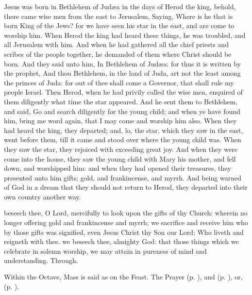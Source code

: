  Jesus was born in Bethlehem of Jud{\ae}a in the days of Herod the king, behold, there came wise men from the east to Jerusalem, Saying, Where is he that is born King of the Jews? for we have seen his star in the east, and are come to worship him. When Herod the king had heard these things, he was troubled, and all Jerusalem with him. And when he had gathered all the chief priests and scribes of the people together, he demanded of them where Christ should be born. And they said unto him, In Bethlehem of Jud{\ae}a: for thus it is written by the prophet, And thou Bethlehem, in the land of Juda, art not the least among the princes of Juda: for out of thee shall come a Governor, that shall rule my people Israel. Then Herod, when he had privily called the wise men, enquired of them diligently what time the star appeared. And he sent them to Bethlehem, and said, Go and search diligently for the young child; and when ye have found him, bring me word again, that I may come and worship him also. When they had heard the king, they departed; and, lo, the star, which they saw in the east, went before them, till it came and stood over where the young child was. When they saw the star, they rejoiced with exceeding great joy. And when they were come into the house, they saw the young child with Mary his mother,  and fell down, and worshipped him: and when they had opened their treasures, they presented unto him gifts; gold, and frankincense, and myrrh. And being warned of God in a dream that they should not return to Herod, they departed into their own country another way.

\secret\label{EpiphanyMassSecret}
 beseech thee, O Lord, mercifully to look upon the gifts of thy Church: wherein no longer offering gold and frankincense and myrrh; we sacrifice and receive him who by those gifts was signified, even Jesus Christ thy Son our Lord; Who liveth and reigneth with thee.
\postcommunion\label{EpiphanyMassPostcommunion}
 we beseech thee, almighty God: that those things which we celebrate in solemn worship, we may attain in pureness of mind and understanding. Through.
\begin{rubric}
    Within the Octave, Mass is said as on the Feast. The  Prayer  (p. \pageref{SPMaryPostChristmas}), and   (p. \pageref{SPAgainst}), or,  (p. \pageref{SPChiefBishop}).
\end{rubric}


